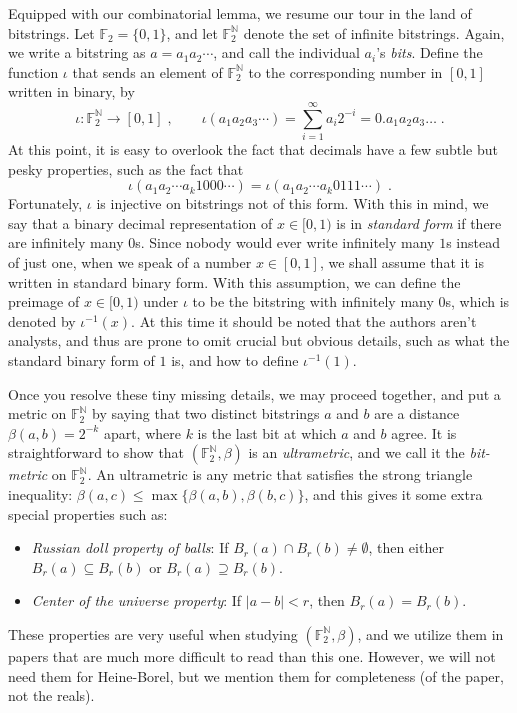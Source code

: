 \documentclass[12pt]{amsart}
\def\F{\mathbb{F}}
\def\N{\mathbb{N}}
\theoremstyle{plain}
\theoremstyle{definition}
\theoremstyle{remark}
\begin{document}
Equipped with our combinatorial lemma, we resume our tour in the land
of bitstrings. Let $\F_2=\{0,1\}$, and let $\F_2^\N$ denote the set of
infinite bitstrings. Again, we write a bitstring as $a=a_1a_2\cdots$,
and call the individual $a_i$'s \emph{bits}. Define the function
$\iota$ that sends an element of $\F_2^\N$ to the corresponding number
in $[0,1]$ written in binary, by
\[
\iota\colon\F_2^\N\longrightarrow[0,1]\;,
\qquad\iota(a_1a_2a_3\cdots)=\sum_{i=1}^\infty a_i
2^{-i}=0.a_1a_2a_3\dots\;.
\]
At this point, it is easy to overlook the fact that decimals have a
few subtle but pesky properties, such as the fact that
\begin{equation*}
  \label{eq:iota}
  \iota(a_1a_2\cdots a_k1000\cdots)
  =\iota(a_1a_2\cdots a_k0111\cdots)\;.
\end{equation*}
Fortunately, $\iota$ is injective on bitstrings not of this form. With
this in mind, we say that a binary decimal representation of
$x\in[0,1)$ is in \emph{standard form} if there are infinitely many
$0$s. Since nobody would ever write infinitely many $1$s instead of
just one, when we speak of a number $x\in[0,1]$, we shall assume that
it is written in standard binary form. With this assumption, we can
define the preimage of $x\in[0,1)$ under $\iota$ to be the bitstring
with infinitely many $0$s, which is denoted by $\iota^{-1}(x)$. At
this time it should be noted that the authors aren't analysts, and
thus are prone to omit crucial but obvious details, such as what the
standard binary form of $1$ is, and how to define $\iota^{-1}(1)$.

Once you resolve these tiny missing details, we may proceed together,
and put a metric on $\F_2^\N$ by saying that two distinct bitstrings
$a$ and $b$ are a distance $\beta(a,b)=2^{-k}$ apart, where $k$ is the
last bit at which $a$ and $b$ agree. It is straightforward to show
that $(\F_2^\N,\beta)$ is an \emph{ultrametric}, and we call it the
\emph{bit-metric} on $\F_2^\N$. An ultrametric is any metric that
satisfies the strong triangle inequality:
$\beta(a,c)\leq\max\{\beta(a,b),\beta(b,c)\}$, and this gives it some
extra special properties such as:
\begin{itemize}
  \item\emph{Russian doll property of balls}: If $B_r(a)\cap
  B_r(b)\neq\emptyset$, then either $B_r(a)\subseteq B_r(b)$ or
  $B_r(a)\supseteq B_r(b)$.
\item\emph{Center of the universe property}: If $|a-b|<r$, then
  $B_r(a)=B_r(b)$.
\end{itemize}
These properties are very useful when studying $(\F_2^\N,\beta)$, and
we utilize them in papers that are much more difficult to read than
this one. However, we will not need them for Heine-Borel, but we
mention them for completeness (of the paper, not the reals). 
\end{document}
